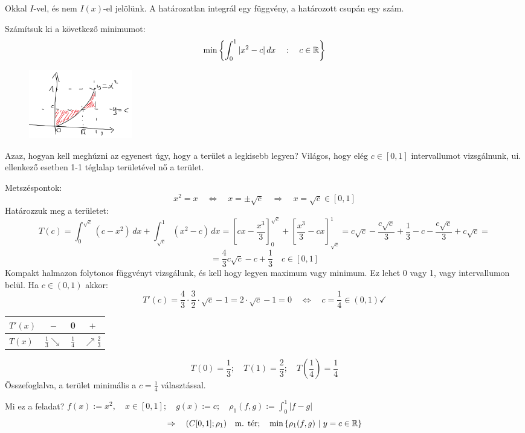 \documentclass[a4paper,11.5pt]{article}
\begin{document}
	\begin{note}
		Okkal $I$-vel, és nem $I(x)$-el jelölünk. A határozatlan integrál egy függvény, a határozott csupán egy szám.
	\end{note}
	\begin{example}
		Számítsuk ki a következő minimumot:
		\[ \min\left\{\int _0^1|x^2-c|\,dx\quad :\quad c\in\mathbb{R} \right\} \]
		\begin{figure}[H]
			\centering
			\includegraphics[height=3cm]{kepek/10.png}
			\caption{}
		\end{figure}
		
		Azaz, hogyan kell meghúzni az egyenest úgy, hogy a terület a legkisebb legyen? Világos, hogy elég $c\in[0,1]$ intervallumot vizsgálnunk, ui. ellenkező esetben 1-1 téglalap területével nő a terület.
		\smallskip
		
		Metszéspontok:
		\[ x^2=x\quad \Leftrightarrow\quad x=\pm\sqrt{c}\quad \Rightarrow\quad x=\sqrt{c}\in[0,1] \]
		Határozzuk meg a területet:
		\[ T(c)=\int_0^{\sqrt{c}}(c-x^2)\,dx+\int_{\sqrt{c}}^{1}(x^2-c)\,dx=\left[cx-\frac{x^3}{3}\right]_0^{\sqrt{c}}+\left[\frac{x^3}{3}-cx\right]^1_{\sqrt{c}}=c\sqrt{c}-\frac{c\sqrt{c}}{3}+\frac{1}{3}-c-\frac{c\sqrt{c}}{3}+c\sqrt{c}=\]
		\[=\frac{4}{3}c\sqrt{c}-c+\frac{1}{3}\quad c\in[0,1] \]
		Kompakt halmazon folytonos függvényt vizsgálunk, és kell hogy legyen maximum vagy minimum. Ez lehet 0 vagy 1, vagy intervallumon belül. Ha $c\in(0,1)$ akkor:
		\[T'(c)=\frac{4}{3}\cdot\frac{3}{2}\cdot\sqrt{c}-1=2\cdot\sqrt{c}-1=0\quad \Leftrightarrow\quad c=\frac{1}{4}\in(0,1)\checkmark \]
		\begin{center}		
			\begin{tabular}{l|c|c|c}
				$T'(x)$&$-$&0&$+$\\
				\hline
				$T(x)$&$\frac{1}{3}\searrow$&$\frac{1}{4}$&$\nearrow\frac{2}{3}$
			\end{tabular}
		\end{center}
		\[ T(0)=\frac{1}{3};\quad T(1)=\frac{2}{3};\quad T\left(\frac{1}{4}\right)=\frac{1}{4} \]
		Összefoglalva, a terület minimális a $c=\frac{1}{4}$ választással.
	\end{example}
	\begin{note}
		Mi ez a feladat? $f(x):=x^2, \quad x\in[0,1];\quad g(x):=c;\quad \rho_1(f,g):=\int_0^1|f-g|$
		\[ \Rightarrow\quad (C[0,1];\rho_1) \quad \text{m. tér};\quad \min\left\{\rho_1(f,g)\ | \ y=c\in\R\right\} \]
	\end{note}
\end{document}
